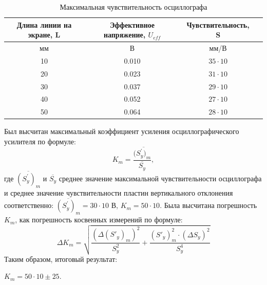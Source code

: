 \begin{center}
\begin{table}[h!]
\centering
\caption{Максимальная чувствительность осциллографа}
\label{tabl:3}
\begin{tabular}{|c|c|c|c|}
\hline
\begin{minipage}{5cm}
    Длина линии на экране, L
\end{minipage} &
\begin{minipage}{5cm}
    Эффективное напряжение, $U_{eff}$
\end{minipage} &
\begin{minipage}{5cm}
    Чувствительность, S
\end{minipage}\\
\hline
мм&В&мм/В\\
\hline
10  &  0.010 &  $35\cdot10$ \\
20  &  0.023  &  $31\cdot10$\\
30  &  0.037  &  $29\cdot10$ \\
40  &  0.052  &  $27\cdot10$ \\
50  &  0.064  &  $28\cdot10$ \\
\hline
\end{tabular}
\end{table}
\end{center}
Был высчитан максимальный коэффициент усиления осциллографического усилителя по формуле:
\begin{equation}
\label{eq:6}
   K_m=\frac{(\overline{S^{'}_y)_m}}{\overline{S^{}_y}},
\end{equation}
где $\overline{(S^{'}_y)_m}$ и $\overline{S^{}_y}$ среднее значение максимальной чувствительности осциллографа и среднее значение чувствительности пластин вертикального отклонения соответственно: $\overline{(S^{'}_y)_m}=30\cdot10$ В, $K_m=50\cdot10$. Была высчитана погрешность $K_m$, как погрешность косвенных измерений по формуле:
\begin{equation}
\Delta K_m = \sqrt{\frac{(\Delta(S'_y)_m)^2}{S_y^2} + \frac{(S'_y)_m^2 \cdot (\Delta S_y)^2}{S_y^4}}
\end{equation}
Таким образом, итоговый результат:
\par$K_m = 50\cdot10 \pm 25$.


